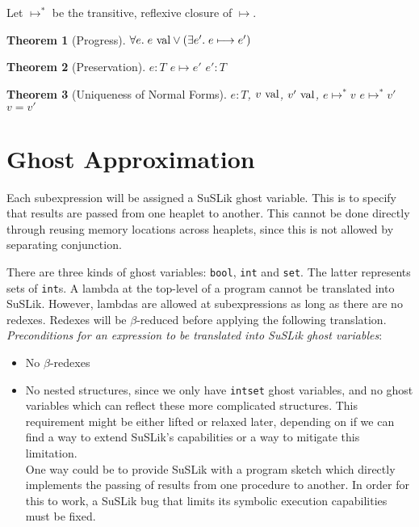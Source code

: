 \documentclass[10pt]{article}
\newtheorem{theorem}{Theorem}
\newcommand{\ra}{\ensuremath{\rightarrow}}
\newcommand{\reduces}{\ensuremath{\longmapsto}}
\newcommand{\reducestr}{\ensuremath{\longmapsto^{*}}}
\newcommand{\val}{\textnormal{ val}}
\begin{document}
\noindent
Let $\reducestr$ be the transitive, reflexive closure of $\reduces$.

\begin{theorem}[Progress]
  $\forall e.\; e \val \lor (\exists e'.\; e \reduces e')$
\end{theorem}

\begin{theorem}[Preservation]
   $e : T$  $e \reduces e'$  $e' : T$
\end{theorem}

\begin{theorem}[Uniqueness of Normal Forms]
   $e : T$, $v \val$, $v' \val$, $e \reducestr v$  $e \reducestr v'$  $v = v'$
\end{theorem}

\section{Ghost Approximation}

Each subexpression will be assigned a SuSLik ghost variable. This is to specify
that results are passed from one heaplet to another. This cannot be done directly
through reusing memory locations across heaplets, since this is not allowed by
separating conjunction.


There are three kinds of ghost variables: \verb|bool|, \verb|int| and \verb|set|. The latter
represents sets of \verb|int|s. A lambda at the top-level of a program cannot be translated into
SuSLik. However, lambdas are allowed at subexpressions as long as there are no redexes. Redexes will
be $\beta$-reduced before applying the following translation.
\\

\noindent
\textit{Preconditions for an expression to be translated into SuSLik ghost variables}:
\begin{itemize}
  \item No $\beta$-redexes
  \item No nested structures, since we only have \verb|intset| ghost variables,
    and no ghost variables which can reflect these more complicated structures. This requirement might be either lifted or relaxed later, depending on
    if we can find a way to extend SuSLik's capabilities or a way to mitigate this limitation.\\
    One way could be to provide SuSLik with a program
    sketch which directly implements the passing of results from one procedure to another. In order for this to work, a SuSLik bug that limits
    its symbolic execution capabilities must be fixed.
\end{itemize}
\end{document}
